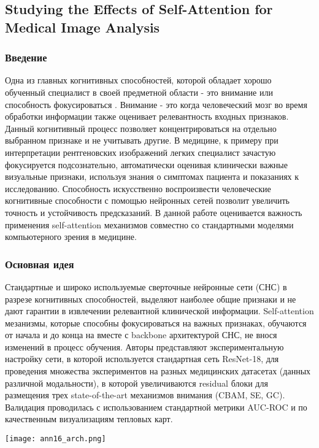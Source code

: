 \subsection*{Studying the Effects of Self-Attention for Medical Image Analysis}

\subsubsection*{Введение}
Одна из главных когнитивных способностей, которой обладает хорошо обученный 
специалист в своей предметной области - это внимание или способность \glqq фокусироваться \grqq .
Внимание - это когда человеческий мозг во время обработки информации также 
оценивает релевантность входных признаков. Данный когнитивный процесс 
позволяет концентрироваться на отдельно выбранном признаке и не учитывать другие.
В медицине, к примеру при интерпретации рентгеновских изображений легких
специалист зачастую фокусируется подсознательно, автоматически оценивая 
клинически важные визуальные признаки, используя знания о симптомах пациента и показаниях
к исследованию. Способность искусственно воспроизвести человеческие 
когнитивные способности с помощью нейронных сетей позволит увеличить точность и 
устойчивость предсказаний. В данной работе \cite{ann16} оценивается важность применения self-attention механизмов 
совместно со стандартными моделями компьютерного зрения в медицине.
\subsubsection*{Основная идея}
Стандартные и широко используемые сверточные нейронные сети (СНС) в разрезе 
когнитивных способностей, выделяют наиболее общие признаки и не дают гарантии в 
извлечении релевантной клинической информации. Self-attention мезанизмы, которые способны 
фокусироваться на важных признаках, обучаются от начала и до конца на вместе 
с backbone архитектурой СНС, не внося изменений в процесс обучения. Авторы представляют 
экспериментальную настройку сети, в которой используется стандартная сеть ResNet-18, для 
проведения множества экспериментов на разных медицинских датасетах (данных различной модальности),
в которой увеличиваются residual блоки для размещения трех state-of-the-art 
механизмов внимания (CBAM, SE, GC). Валидация проводилась с использованием стандартной метрики AUC-ROC 
и по качественным визуализациям тепловых карт. \\
\begin{minipage}{1.0\linewidth}
    \begin{center}
        \texttt{[image: ann16\_arch.png]} \\
    \end{center}
    
\end{minipage}
